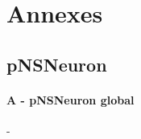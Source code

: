 \documentclass[10pt]{article}
\begin{document}

\newpage
\section{Annexes}
\subsection{pNSNeuron}
\paragraph{A - pNSNeuron global}-\\
\begin{center}
\\
\end{center}
\end{document}
